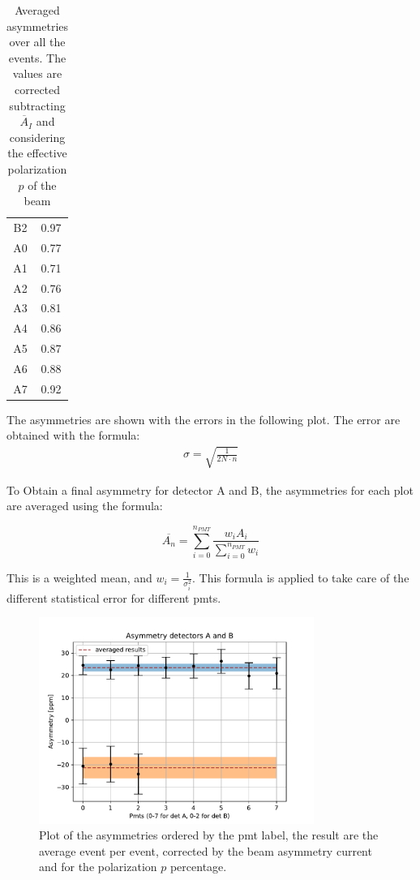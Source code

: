 \begin{table}[!ht]
{\begin{tabular}{c|c}
 B2    & 0.97 \\
 A0    & 0.77 \\
 A1    & 0.71 \\
 A2    & 0.76 \\
 A3    & 0.81 \\
 A4    & 0.86 \\
 A5    & 0.87 \\
 A6    & 0.88 \\
 A7    & 0.92 \\
\hline
\end{tabular}}
\caption{Averaged asymmetries over all the events. The values are corrected subtracting $\overline{A}_{I}$ and considering the effective polarization $p$ of the beam}
\end{table}

The asymmetries are shown with the errors in the following plot. The error are obtained with the formula:
\begin{align*}
\sigma = \sqrt{\frac{1}{2 N \cdot n}}
\end{align*}

To Obtain a final asymmetry for detector A and B, the asymmetries for each plot are averaged using the formula:

\begin{equation}
\overline{A_{n}} = \sum_{i = 0}^{n_{PMT}} \dfrac{ w_{i} A_{i}}{\sum_{i = 0}^{n_{PMT}} w_{i}}
\end{equation}

This is a weighted mean, and $w_{i} = \frac{1}{\sigma^{2}_{i}}$. This formula is applied to take care of the different statistical error for different pmts.

\begin{figure}[hbtp]
\centering
\includegraphics[width = 0.80\textwidth]{Analysis/Dataselection/FirstResult.pdf}
\caption{Plot of the asymmetries ordered by the pmt label, the result are the average event per event, corrected by the beam asymmetry current and for the polarization $p$ percentage.}
\end{figure}

